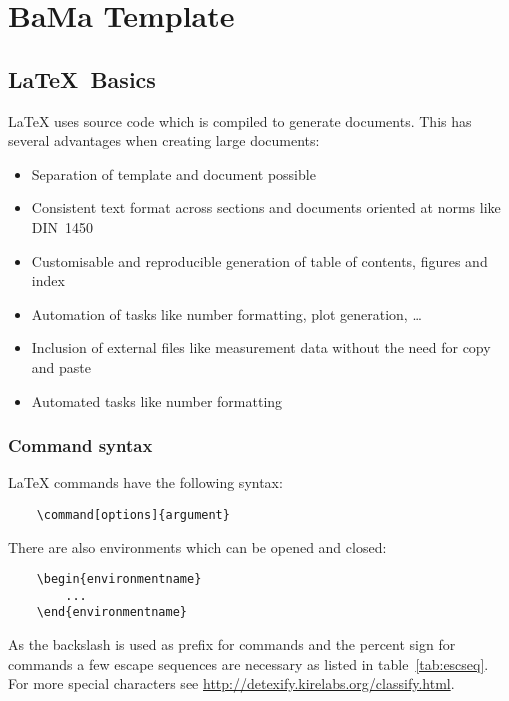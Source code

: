 
\chapter{BaMa Template}

\section{\LaTeX~Basics}

LaTeX uses source code which is compiled to generate documents. This has several advantages when creating large documents: 

\begin{itemize}
	\item Separation of template and document possible
	\item Consistent text format across sections and documents oriented at norms like DIN~1450
	\item Customisable and reproducible generation of table of contents, figures and index
	\item Automation of tasks like number formatting, plot generation, \dots
	\item Inclusion of external files like measurement data without the need for copy and paste
	\item Automated tasks like number formatting 
\end{itemize}

\subsection{Command syntax}

LaTeX commands have the following syntax:

\begin{lstlisting}
	\command[options]{argument}
\end{lstlisting}

There are also environments which can be opened and closed:

\begin{lstlisting}
	\begin{environmentname}
		...
	\end{environmentname}
\end{lstlisting}

As the backslash is used as prefix for commands and the percent sign for commands a few escape sequences are necessary as listed in table~\ref{tab:escseq}. For more special characters see \url{http://detexify.kirelabs.org/classify.html}.

